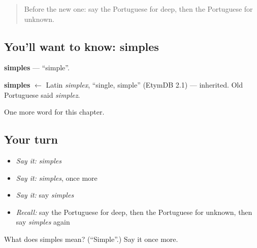\label{lesson:PT-C241-simples}



\begin{quote}
Before the new one: say the Portuguese for deep, then the Portuguese for unknown.
\end{quote}

\subsection*{You'll want to know: simples}
\textbf{simples} — \textquotedblleft{}simple\textquotedblright{}.

\begin{cousinweb}
\textbf{simples} $\leftarrow$ Latin \emph{simplex}, \textquotedblleft{}single, simple\textquotedblright{} (EtymDB 2.1) — inherited. Old Portuguese said \emph{simplez}.
\end{cousinweb}

\begin{grammarlens}[title={What you've built}]
One more word for this chapter.
\end{grammarlens}

\subsection*{Your turn}
\begin{itemize}
\raggedright
  \item \emph{Say it:} \emph{simples}
  \item \emph{Say it:} \emph{simples}, once more
  \item \emph{Say it:} say \emph{simples}
  \item \emph{Recall:} say the Portuguese for deep, then the Portuguese for unknown, then say \emph{simples} again
\end{itemize}

\begin{tcolorbox}[breakable,colback=teal!4,colframe=teal!35!black,title={Before you move on}]
What does simples mean? (\textquotedblleft{}Simple\textquotedblright{}.) Say it once more.
\end{tcolorbox}
